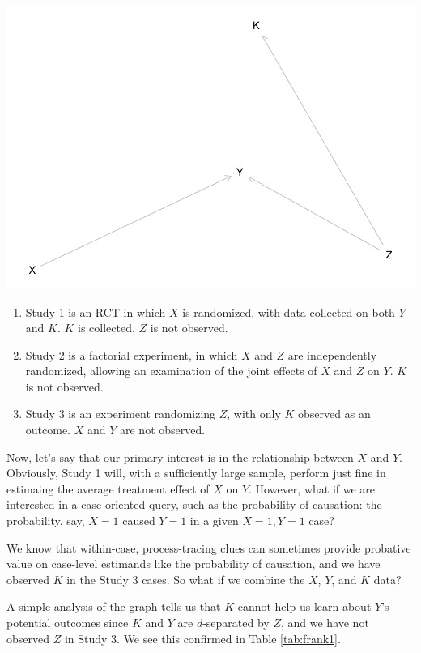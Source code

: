 \documentclass[
  12pt,
]{book}
\providecommand{\tightlist}{%
  \setlength{\itemsep}{0pt}\setlength{\parskip}{0pt}}
\begin{document}
\includegraphics{ii_files/figure-latex/jigsaw-1.pdf}

\begin{enumerate}
\def\labelenumi{\arabic{enumi}.}
\tightlist
\item
  Study 1 is an RCT in which \(X\) is randomized, with data collected on both \(Y\) and \(K\). \(K\) is collected. \(Z\) is not observed.
\item
  Study 2 is a factorial experiment, in which \(X\) and \(Z\) are independently randomized, allowing an examination of the joint effects of \(X\) and \(Z\) on \(Y\). \(K\) is not observed.
\item
  Study 3 is an experiment randomizing \(Z\), with only \(K\) observed as an outcome. \(X\) and \(Y\) are not observed.
\end{enumerate}

Now, let's say that our primary interest is in the relationship between \(X\) and \(Y\). Obviously, Study 1 will, with a sufficiently large sample, perform just fine in estimaing the average treatment effect of \(X\) on \(Y\). However, what if we are interested in a case-oriented query, such as the probability of causation: the probability, say, \(X=1\) caused \(Y=1\) in a given \(X=1, Y=1\) case?

We know that within-case, process-tracing clues can sometimes provide probative value on case-level estimands like the probability of causation, and we have observed \(K\) in the Study 3 cases. So what if we combine the \(X\), \(Y\), and \(K\) data?

A simple analysis of the graph tells us that \(K\) cannot help us learn about \(Y\)'s potential outcomes since \(K\) and \(Y\) are \(d\)-separated by \(Z\), and we have not observed \(Z\) in Study 3. We see this confirmed in Table \ref{tab:frank1}.
\end{document}
